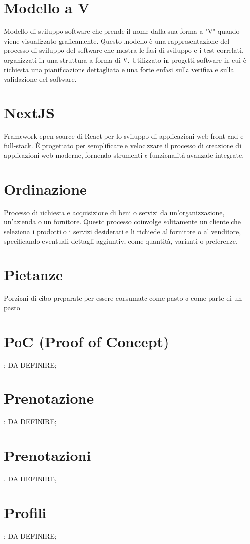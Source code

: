 \section{Modello a V}
Modello di sviluppo software che prende il nome dalla sua forma a "V" quando viene visualizzato graficamente. Questo modello è una rappresentazione del processo di sviluppo del software che mostra le fasi di sviluppo e i test correlati, organizzati in una struttura a forma di V. Utilizzato in progetti software in cui è richiesta una pianificazione dettagliata e una forte enfasi sulla verifica e sulla validazione del software.

\section{NextJS}
Framework open-source di React per lo sviluppo di applicazioni web front-end e full-stack. È progettato per semplificare e velocizzare il processo di creazione di applicazioni web moderne, fornendo strumenti e funzionalità avanzate integrate.

\section{Ordinazione}
Processo di richiesta e acquisizione di beni o servizi da un'organizzazione, un'azienda o un fornitore. Questo processo coinvolge solitamente un cliente che seleziona i prodotti o i servizi desiderati e li richiede al fornitore o al venditore, specificando eventuali dettagli aggiuntivi come quantità, varianti o preferenze.

\section{Pietanze}
Porzioni di cibo preparate per essere consumate come pasto o come parte di un pasto.

\section{PoC (Proof of Concept)}: DA DEFINIRE;
\section{Prenotazione}: DA DEFINIRE;
\section{Prenotazioni}: DA DEFINIRE;
\section{Profili}: DA DEFINIRE;
